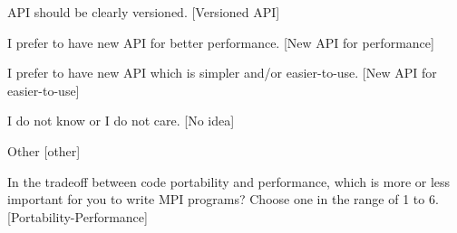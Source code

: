 \documentclass[conference,10pt,letterpaper]{IEEEtran}
\begin{document}
{{\begin{description}
\begin{inparaenum}[{\bf C}1)]
    \item API should be clearly versioned. [Versioned API]
    \item I prefer to have new API for better performance. [New API for performance]
    \item I prefer to have new API which is simpler and/or
      easier-to-use. [New API for easier-to-use] 
    \item I do not know or I do not care. [No idea]
    \item Other [other]
    \end{inparaenum}
  \item[Q29:] In the tradeoff between code portability and performance,
    which is more or less important for you to write MPI programs? 
    Choose one in the range of 1 to 6. [Portability-Performance]
  \end{description}
}}
\end{document}
